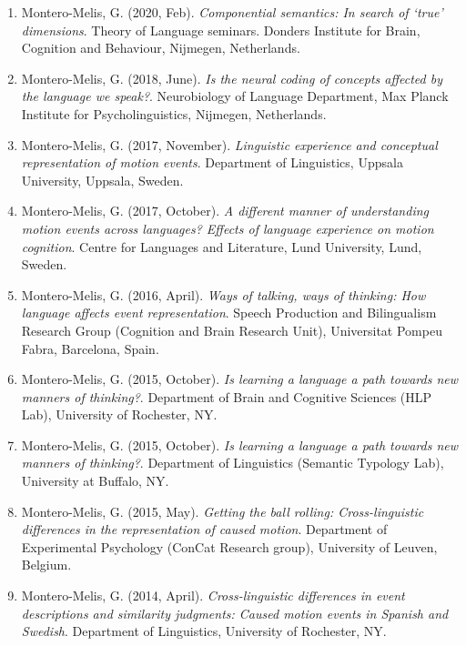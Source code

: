 \documentclass[margin, 11pt]{res} %
\begin{document}
\begin{resume}
\begin{enumerate}

\item Montero-Melis, G. (2020, Feb). \textit{Componential semantics: 
In search of `true' dimensions}. Theory of Language seminars. Donders Institute for Brain, Cognition and Behaviour, Nijmegen, Netherlands.


\item Montero-Melis, G. (2018, June). \textit{Is the neural coding of concepts affected by the language we speak?}. Neurobiology of Language Department, Max Planck Institute for Psycholinguistics, Nijmegen, Netherlands.

\item Montero-Melis, G. (2017, November). \textit{Linguistic experience and conceptual representation of motion events}. Department of Linguistics, Uppsala University, Uppsala, Sweden.

\item Montero-Melis, G. (2017, October). \textit{A different manner of understanding motion events across languages? Effects of language experience on motion cognition}. Centre for Languages and Literature, Lund University, Lund, Sweden.

\item Montero-Melis, G. (2016, April). \textit{Ways of talking, ways of thinking: How language affects event representation}. Speech Production and Bilingualism Research Group (Cognition and Brain Research Unit), Universitat Pompeu Fabra, Barcelona, Spain.

\item Montero-Melis, G. (2015, October). \textit{Is learning a language a path towards new manners of thinking?}. Department of Brain and Cognitive Sciences (HLP Lab), University of Rochester, NY.

\item Montero-Melis, G. (2015, October). \textit{Is learning a language a path towards new manners of thinking?}. Department of Linguistics (Semantic Typology Lab), University at Buffalo, NY.

\item Montero-Melis, G. (2015, May). \textit{Getting the ball rolling: Cross-linguistic differences in the representation of caused motion}. Department of Experimental Psychology (ConCat Research group), University of Leuven, Belgium.

\item Montero-Melis, G. (2014, April). \textit{Cross-linguistic differences in event descriptions and similarity judgments: Caused motion events in Spanish and Swedish}. Department of Linguistics, University of Rochester, NY.


\end{enumerate}
\end{resume}
\end{document}
